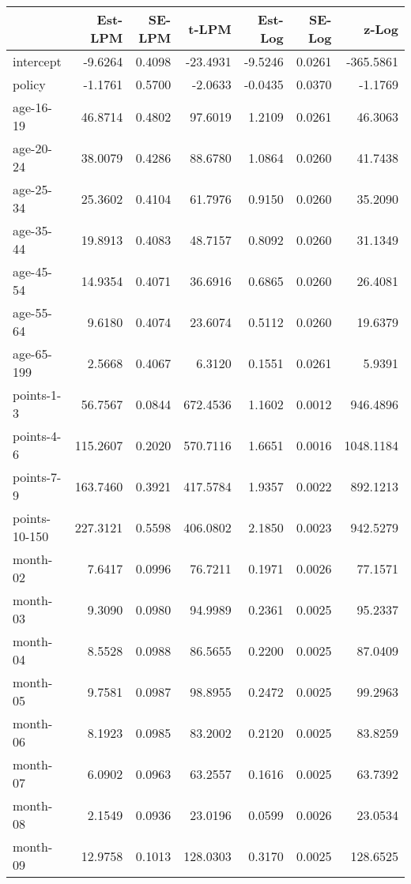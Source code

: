 \documentclass[10pt]{article}
\begin{document}
\begin{table}[ht]
\centering
\begin{tabular}{lrrrrrr}
  \hline
 & Est-LPM & SE-LPM & t-LPM & Est-Log & SE-Log & z-Log \\ 
  \hline
intercept & -9.6264 & 0.4098 & -23.4931 & -9.5246 & 0.0261 & -365.5861 \\ 
  policy & -1.1761 & 0.5700 & -2.0633 & -0.0435 & 0.0370 & -1.1769 \\ 
  age-16-19 & 46.8714 & 0.4802 & 97.6019 & 1.2109 & 0.0261 & 46.3063 \\ 
  age-20-24 & 38.0079 & 0.4286 & 88.6780 & 1.0864 & 0.0260 & 41.7438 \\ 
  age-25-34 & 25.3602 & 0.4104 & 61.7976 & 0.9150 & 0.0260 & 35.2090 \\ 
  age-35-44 & 19.8913 & 0.4083 & 48.7157 & 0.8092 & 0.0260 & 31.1349 \\ 
  age-45-54 & 14.9354 & 0.4071 & 36.6916 & 0.6865 & 0.0260 & 26.4081 \\ 
  age-55-64 & 9.6180 & 0.4074 & 23.6074 & 0.5112 & 0.0260 & 19.6379 \\ 
  age-65-199 & 2.5668 & 0.4067 & 6.3120 & 0.1551 & 0.0261 & 5.9391 \\ 
  points-1-3 & 56.7567 & 0.0844 & 672.4536 & 1.1602 & 0.0012 & 946.4896 \\ 
  points-4-6 & 115.2607 & 0.2020 & 570.7116 & 1.6651 & 0.0016 & 1048.1184 \\ 
  points-7-9 & 163.7460 & 0.3921 & 417.5784 & 1.9357 & 0.0022 & 892.1213 \\ 
  points-10-150 & 227.3121 & 0.5598 & 406.0802 & 2.1850 & 0.0023 & 942.5279 \\ 
  month-02 & 7.6417 & 0.0996 & 76.7211 & 0.1971 & 0.0026 & 77.1571 \\ 
  month-03 & 9.3090 & 0.0980 & 94.9989 & 0.2361 & 0.0025 & 95.2337 \\ 
  month-04 & 8.5528 & 0.0988 & 86.5655 & 0.2200 & 0.0025 & 87.0409 \\ 
  month-05 & 9.7581 & 0.0987 & 98.8955 & 0.2472 & 0.0025 & 99.2963 \\ 
  month-06 & 8.1923 & 0.0985 & 83.2002 & 0.2120 & 0.0025 & 83.8259 \\ 
  month-07 & 6.0902 & 0.0963 & 63.2557 & 0.1616 & 0.0025 & 63.7392 \\ 
  month-08 & 2.1549 & 0.0936 & 23.0196 & 0.0599 & 0.0026 & 23.0534 \\ 
  month-09 & 12.9758 & 0.1013 & 128.0303 & 0.3170 & 0.0025 & 128.6525 \\ 

\end{tabular}
\end{table}
\end{document}
